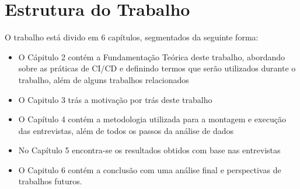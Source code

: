 \section{Estrutura do Trabalho}
 O trabalho está divido em 6 capítulos, segmentados da seguinte forma:

 \begin{itemize}
     \item O Cápitulo 2 contém a Fundamentação Teórica deste trabalho, abordando sobre as práticas de CI/CD e definindo termos que serão utilizados durante o trabalho, além de alguns trabalhos relacionados
     \item O Capitulo 3 trás a motivação por trás deste trabalho
     \item O Capítulo 4 contém a metodologia utilizada para a montagem e execução das entrevistas, além de todos os passos da análise de dados
     \item No Capítulo 5 encontra-se os resultados obtidos com base nas entrevistas
     \item O Capitulo 6 contém a conclusão com uma análise final e perspectivas de trabalhos futuros.
 \end{itemize}
